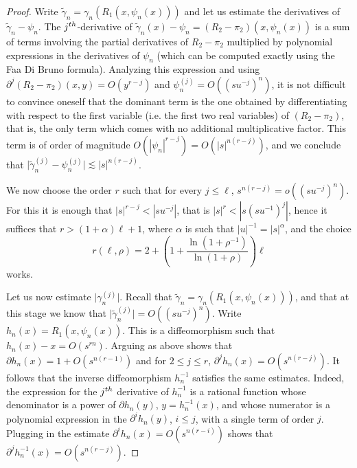 \documentclass[11pt, oneside]{amsart}
\newcommand{\fr}{\partial}
\newcommand{\abs}[1]{\left\vert#1\right\vert}
\newcommand{\lrpar}[1]{\left(#1\right)}
\newcommand{\inv}{^{-1}}
\theoremstyle{remark}
\theoremstyle{definition}
\theoremstyle{theorem}
\begin{document}
\begin{proof}
Write $\widetilde \gamma_n = \gamma_n( R_1(x, \psi_n(x)))$ and let us estimate the derivatives of 
$\widetilde \gamma_n  - \psi_n$. The $j^{\rm th}$-derivative of 
$\widetilde \gamma_n(x) - \psi_n=  (R_2 - \pi_2) (x , \psi_n(x))$   is a sum of terms involving 
the partial derivatives of $R_2-\pi_2$ multiplied by
 polynomial expressions  in the derivatives of $\psi_n$ 
(which can be 
computed exactly using  the Faa Di Bruno formula). Analyzing this expression and using 
 $\fr^j(R_2 - \pi_2)(x,y) = O( {y}^{r-j})$ and $\psi_n^{(j)} = O((s u^{-j})^n)$, it is not 
difficult to convince oneself that the dominant term is the one obtained 
 by differentiating with respect to the 
first variable (i.e. the first two real variables) of $(R_2 - \pi_2)$, that is, the only term which comes with no additional
multiplicative factor. This term 
  is of order of magnitude $O(\abs{\psi_n}^{r-j}) = O(\abs{s}^{n(r-j)})$, and we conclude that 
$\big\vert{\widetilde \gamma_n^{(j)} - \psi_n^{(j)}}\big\vert \lesssim \abs{s}^{n(r-j)}$. 

We now choose the order $r$ such that for every $j\leq \ell$, ${s}^{n(r-j)} = o((su^{-j})^n)$. For this it is enough that 
$\abs{s}^{r- j}<\abs{su^{-j}}$, that is $\abs{s}^r < \abs{s (su\inv)^j}$, hence  it suffices that 
$r> (1+\alpha)\ell+1$, where $\alpha$ is such that $\abs{u}\inv = \abs{s}^\alpha$, and  the choice 
 \begin{equation}\label{eq:choice_r}
 r(\ell, \rho) = 2+ \lrpar{   1+\frac{\ln(1+\rho\inv)} {\ln(1+\rho)} } \ell
 \end{equation}
works. 

 Let us now estimate $\big\vert{ \gamma_n^{(j)} }\big\vert$. Recall that  $\widetilde \gamma_n = \gamma_n( R_1(x, \psi_n(x)))$, and that 
 at this stage we know that $\big\vert{\widetilde \gamma_n^{(j)}  }\big\vert  = O ((su^{-j})^n)$. Write $h_n (x) = R_1(x, \psi_n(x))$. This is 
 a diffeomorphism such that $h_n(x) - x =O(s^{rn})$. Arguing as above shows that 
 $  \fr h_n(x) = 1+ O(s^{n(r-1)})$ and for $2\leq j\leq r$,  $\fr^j h_n(x)  = O(s^{n(r-j)})$. It follows that the inverse diffeomorphism 
 $h_n\inv$ satisfies the same estimates. Indeed, the expression for the $j^{\rm th}$   derivative of $h_n\inv$  is a rational function whose denominator is a power of  $  \fr h_n( y)$, $y = h_n\inv(x)$,
 and whose numerator is a polynomial expression in 
 the $\fr^ih_n  (y)$, $i\leq j$, with a single term of order $j$. Plugging in the estimate $\fr^i h_n(x)  = O(s^{n(r-i)})$
 shows that $\fr^j h_n\inv(x)  = O(s^{n(r-j)})$. 
 

\end{proof}
\end{document}
